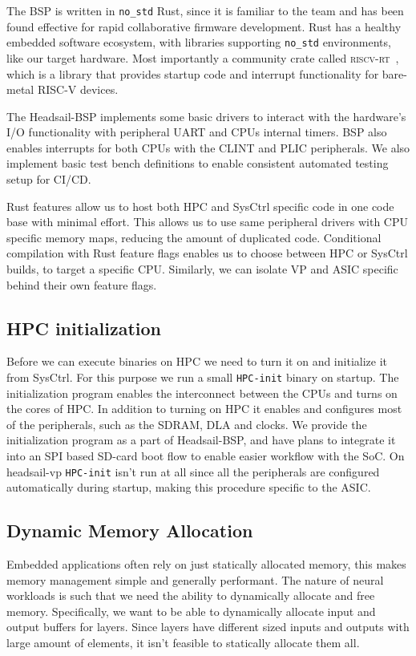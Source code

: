 \documentclass[12pt,a4paper,english
]{tunithesis}
\begin{document}
The BSP is written in \texttt{no\_std} Rust, since it is familiar to the team and has been found effective for rapid collaborative firmware development. Rust has a healthy embedded software ecosystem, with libraries supporting \texttt{no\_std} environments, like our target hardware. Most importantly a community crate called \textsc{riscv-rt}~\cite{riscv_rt}, which is a library that provides startup code and interrupt functionality for bare-metal RISC-V devices.

The Headsail-BSP implements some basic drivers to interact with the hardware's I/O functionality with peripheral UART and CPUs internal timers. BSP also enables interrupts for both CPUs with the CLINT and PLIC peripherals. We also implement basic test bench definitions to enable consistent automated testing setup for CI/CD.

Rust features allow us to host both HPC and SysCtrl specific code in one code base with minimal effort. This allows us to use same peripheral drivers with CPU specific memory maps, reducing the amount of duplicated code. Conditional compilation with Rust feature flags enables us to choose between HPC or SysCtrl builds, to target a specific CPU. Similarly, we can isolate VP and ASIC specific behind their own feature flags.

\subsection{HPC initialization}
Before we can execute binaries on HPC we need to turn it on and initialize it from SysCtrl. For this purpose we run a small \texttt{HPC-init} binary on startup. The initialization program enables the interconnect between the CPUs and turns on the cores of HPC. In addition to turning on HPC it enables and configures most of the peripherals, such as the SDRAM, DLA and clocks.
We provide the initialization program as a part of Headsail-BSP, and have plans to integrate it into an SPI based SD-card boot flow to enable easier workflow with the SoC.
On headsail-vp \texttt{HPC-init} isn't run at all since all the peripherals are configured automatically during startup, making this procedure specific to the ASIC.

\subsection{Dynamic Memory Allocation}
Embedded applications often rely on just statically allocated memory, this makes memory management simple and generally performant. The nature of neural workloads is such that we need the ability to dynamically allocate and free memory. Specifically, we want to be able to dynamically allocate input and output buffers for layers. Since layers have different sized inputs and outputs with large amount of elements, it isn't feasible to statically allocate them all.
\end{document}
